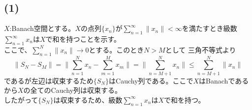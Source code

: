 \documentclass[a4paper,10pt]{jsarticle}
\begin{document}
\subsection{(1)}
$X$:Banach空間とする。$X$の点列$\{x_n\}$が$\sum_{n=1}^\infty \|x_n\| < \infty$を満たすとき級数$\sum_{n=1}^\infty x_n$は$X$で和を持つことを示す。\\

ここで、$\sum_{n=1}^N\|x_n\|\to0$とする。このとき$N>M$として
三角不等式より
\begin{equation}
 \|S_N-S_M\|=\|\sum_{n=1}^Nx_n -\sum_{m=1}^Mx_m\|=\|\sum_{n=M+1}^Nx_n\|\le\sum_{n=M+1}^N\|x_n\|
\end{equation}
であるが左辺は収束するため$\{S_N\}$はCauchy列である。ここで$X$はBanachであるから$X$の全てのCauchy列は収束する。\\
したがって$\{S_N\}$は収束するため、級数$\sum_{n=1}^\infty x_n$は$X$で和を持つ。
\end{document}
